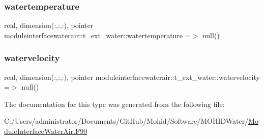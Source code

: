 \subsubsection{\texorpdfstring{watertemperature}{watertemperature}}
{\footnotesize\ttfamily real, dimension(\+:,\+:,\+:), pointer moduleinterfacewaterair\+::t\+\_\+ext\+\_\+water\+::watertemperature =$>$ null()\hspace{0.3cm}{\ttfamily [private]}}

\mbox{\label{structmoduleinterfacewaterair_1_1t__ext__water_acb10dc56aa768ded0b82c0da9e9890b3}} 
\subsubsection{\texorpdfstring{watervelocity}{watervelocity}}
{\footnotesize\ttfamily real, dimension(\+:,\+:,\+:), pointer moduleinterfacewaterair\+::t\+\_\+ext\+\_\+water\+::watervelocity =$>$ null()\hspace{0.3cm}{\ttfamily [private]}}



The documentation for this type was generated from the following file\+:\begin{DoxyCompactItemize}
\item 
C\+:/\+Users/administrator/\+Documents/\+Git\+Hub/\+Mohid/\+Software/\+M\+O\+H\+I\+D\+Water/\mbox{\hyperlink{_module_interface_water_air_8_f90}{Module\+Interface\+Water\+Air.\+F90}}\end{DoxyCompactItemize}
